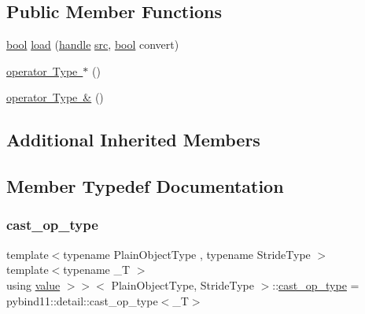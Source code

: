 \subsection*{Public Member Functions}
\begin{DoxyCompactItemize}
\item 
\mbox{\hyperlink{asdl_8h_af6a258d8f3ee5206d682d799316314b1}{bool}} \mbox{\hyperlink{structtype__caster_3_01_eigen_1_1_ref_3_01_plain_object_type_00_010_00_01_stride_type_01_4_00_014483c445e66b0d8d9bb7fc2aa837ecac_a309c5508a42ddc540a20c3e3cb733ba6}{load}} (\mbox{\hyperlink{classhandle}{handle}} \mbox{\hyperlink{_s_d_l__opengl__glext_8h_a72e0fdf0f845ded60b1fada9e9195cd7}{src}}, \mbox{\hyperlink{asdl_8h_af6a258d8f3ee5206d682d799316314b1}{bool}} convert)
\item 
\mbox{\hyperlink{structtype__caster_3_01_eigen_1_1_ref_3_01_plain_object_type_00_010_00_01_stride_type_01_4_00_014483c445e66b0d8d9bb7fc2aa837ecac_aa94cbaee52ae9c97fd8186a7c644bb85}{operator Type $\ast$}} ()
\item 
\mbox{\hyperlink{structtype__caster_3_01_eigen_1_1_ref_3_01_plain_object_type_00_010_00_01_stride_type_01_4_00_014483c445e66b0d8d9bb7fc2aa837ecac_ad827f6b614a298d03de2029da5f56639}{operator Type \&}} ()
\end{DoxyCompactItemize}
\subsection*{Additional Inherited Members}


\subsection{Member Typedef Documentation}
\mbox{\label{structtype__caster_3_01_eigen_1_1_ref_3_01_plain_object_type_00_010_00_01_stride_type_01_4_00_014483c445e66b0d8d9bb7fc2aa837ecac_a8508add2dda883fb545f1dd99f308f9e}} 
\subsubsection{\texorpdfstring{cast\_op\_type}{cast\_op\_type}}
{\footnotesize\ttfamily template$<$typename Plain\+Object\+Type , typename Stride\+Type $>$ \\
template$<$typename \+\_\+T $>$ \\
using \mbox{\hyperlink{_s_d_l__opengl__glext_8h_a8ad81492d410ff2ac11f754f4042150f}{value}} $>$$>$$<$ Plain\+Object\+Type, Stride\+Type $>$\+::\mbox{\hyperlink{structtype__caster_3_01_eigen_1_1_ref_3_01_plain_object_type_00_010_00_01_stride_type_01_4_00_014483c445e66b0d8d9bb7fc2aa837ecac_a8508add2dda883fb545f1dd99f308f9e}{cast\+\_\+op\+\_\+type}} =  pybind11\+::detail\+::cast\+\_\+op\+\_\+type$<$\+\_\+T$>$}




